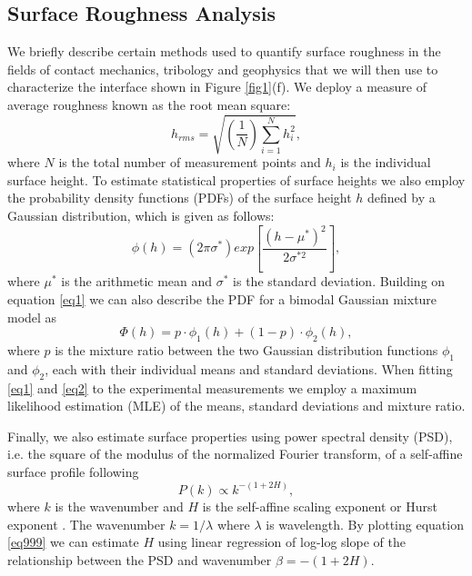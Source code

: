 \documentclass[preprint,1p, 10pt,authoryear]{elsarticle}
\begin{document}
\subsection{Surface Roughness Analysis}
\label{SRA}
We briefly describe certain methods used to quantify surface roughness in the fields of contact mechanics, tribology and geophysics that we will then use to characterize the interface shown in Figure \ref{fig1}(f). We deploy a measure of average roughness known as the root mean square:
\begin{equation}
h_{rms} = \sqrt{\left(\frac{1}{N} \right) \sum^{N}_{i=1} h_{i}^{2}} ,
\label{eq99}
\end{equation}
\noindent where $N$ is the total number of measurement points and $h_{i}$ is the individual surface height. To estimate statistical properties of surface heights we also employ the probability density functions (PDFs) of the surface height $h$ defined by a Gaussian distribution, which is given as follows:
\begin{equation}
\phi(h) = \left( 2\pi \sigma^{*} \right) exp\left[ \frac{\left(h - \mu^{*}\right)^{2}} { 2\sigma^{*2}}  \right],
\label{eq1}
\end{equation} 
\noindent where $\mu^{*}$ is the arithmetic mean and $\sigma^{*}$ is the standard deviation. Building on equation \eqref{eq1} we can also describe the PDF for a bimodal Gaussian mixture model as 
\begin{equation}
\Phi(h) = p\cdot \phi_{1}(h)+\left(1-p\right)\cdot \phi_{2}(h),
\label{eq2}
\end{equation}
\noindent where $p$ is the mixture ratio between the two Gaussian distribution functions $\phi_{1}$ and $\phi_{2}$, each with their individual means and standard deviations. When fitting \eqref{eq1} and \eqref{eq2} to the experimental measurements we employ a maximum likelihood estimation (MLE) of the means, standard deviations and mixture ratio. 

Finally, we also estimate surface properties using power spectral density (PSD), i.e.  the square of the modulus of the normalized Fourier transform, of a self-affine surface profile following 
\begin{equation}
P(k) \propto k^{-(1+2H)},
\label{eq999}
\end{equation}
\noindent where $k$ is the wavenumber and $H$ is the self-affine scaling exponent or Hurst exponent \citep{Power1991, Schmittbuhl1995, Candela2009}. The wavenumber $k = 1/\lambda$ where $\lambda$ is wavelength. By plotting equation \eqref{eq999} we can estimate $H$ using linear regression of log-log slope of the relationship between the PSD and wavenumber $\beta =-(1+2H)$.  
\end{document}
